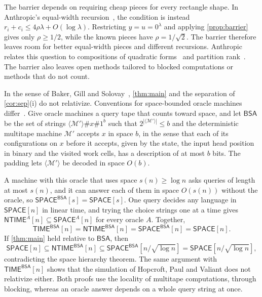 \documentclass[11pt]{article}
\theoremstyle{definition}
\theoremstyle{definition}
\theoremstyle{remark}
\newcommand{\NTIME}{\mathsf{NTIME}}
\newcommand{\TIME}{\mathsf{TIME}}
\newcommand{\SPACE}{\mathsf{SPACE}}
\begin{document}
The barrier depends on requiring cheap pieces for every rectangle shape. In Anthropic's equal-width recursion~\cite{Ant26}, the condition is instead $r_i+c_i\le4\rho\lambda+O(\log\lambda)$. Restricting $y=u=0^\lambda$ and applying \cref{prop:barrier} gives only $\rho\ge1/2$, while the known pieces have $\rho=1/\sqrt2$. The barrier therefore leaves room for better equal-width pieces and different recursions. Anthropic relates this question to compositions of quadratic forms~\cite{Hur98,Sha00} and partition rank~\cite{Nas20}. The barrier also leaves open methods tailored to blocked computations or methods that do not count.

\begin{remark}[Relativization]\label{rem:relativize}
In the sense of Baker, Gill and Solovay~\cite{BGS75}, \cref{thm:main} and the separation of \cref{cor:sep}(i) do not relativize. Conventions for space-bounded oracle machines differ~\cite{LL76,RST84}. Give oracle machines a query tape that counts toward space, and let $\mathsf{BSA}$ be the set of strings $\langle\mathcal M'\rangle\#x\#1^b$ such that $2^{|\langle\mathcal M'\rangle|}\le b$ and the deterministic multitape machine $\mathcal M'$ accepts $x$ in space $b$, in the sense that each of its configurations on $x$ before it accepts, given by the state, the input head position in binary and the visited work cells, has a description of at most $b$ bits. The padding lets $\langle\mathcal M'\rangle$ be decoded in space $O(b)$.

A machine with this oracle that uses space $s(n)\ge\log n$ asks queries of length at most $s(n)$, and it can answer each of them in space $O(s(n))$ without the oracle, so $\SPACE^{\mathsf{BSA}}[s]=\SPACE[s]$. One query decides any language in $\SPACE[n]$ in linear time, and trying the choice strings one at a time gives $\NTIME^A[n]\subseteq\SPACE^A[n]$ for every oracle $A$. Together,
\[\TIME^{\mathsf{BSA}}[n]=\NTIME^{\mathsf{BSA}}[n]=\SPACE^{\mathsf{BSA}}[n]=\SPACE[n].\]
If \cref{thm:main} held relative to $\mathsf{BSA}$, then\[\SPACE[n]\subseteq\NTIME^{\mathsf{BSA}}[n]\subseteq\SPACE^{\mathsf{BSA}}[n/\sqrt{\log n}]=\SPACE[n/\sqrt{\log n}],\]contradicting the space hierarchy theorem. The same argument with $\TIME^{\mathsf{BSA}}[n]$ shows that the simulation of Hopcroft, Paul and Valiant does not relativize either. Both proofs use the locality of multitape computations, through blocking, whereas an oracle answer depends on a whole query string at once.
\end{remark}
\end{document}
